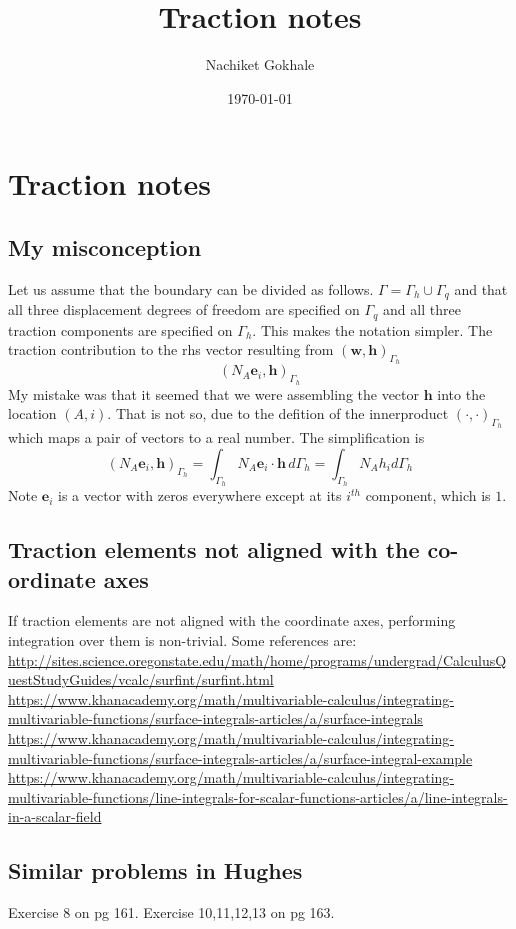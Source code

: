 \documentclass{article}
\newcommand{\beq}{\begin{equation}}
\newcommand{\eeq}{\end{equation}}
\begin{document}
\title{Traction notes}
\author{Nachiket Gokhale}
\date{\today}
\maketitle
\section{Traction notes}
\subsection{My misconception}
Let us assume that the boundary can be divided as follows. $\Gamma=\Gamma_h\cup\Gamma_q$ and that all three displacement degrees of freedom are specified on $\Gamma_q$ and all three traction components are specified on $\Gamma_h$. This makes the notation simpler. The traction contribution to the rhs vector resulting from $(\mathbf{w},\mathbf{h})_{\Gamma_h}$
\beq
(N_A\mathbf{e}_{i},\mathbf{h})_{\Gamma_h}
\eeq
My mistake was that it seemed that we were assembling the vector $\mathbf{h}$ into the location $(A,i)$. That is not so, due to the defition of the innerproduct $(\cdot,\cdot)_{\Gamma_h}$ which maps a pair of vectors to a real number. The simplification is
\beq
(N_A\mathbf{e}_{i},\mathbf{h})_{\Gamma_h} = \int_{\Gamma_h} N_{A}\mathbf{e}_{i}\cdot\mathbf{h}\,d\Gamma_{h} = \int_{\Gamma_h}N_Ah_id\Gamma_{h}
\eeq
Note $\mathbf{e}_{i}$ is a vector with zeros everywhere except at its $i^{th}$ component, which is $1$.
\subsection{Traction elements not aligned with the co-ordinate axes}
If traction elements are not aligned with the coordinate axes, performing integration over them is non-trivial. Some references are:\\
\url{http://sites.science.oregonstate.edu/math/home/programs/undergrad/CalculusQuestStudyGuides/vcalc/surfint/surfint.html}\\
\url{https://www.khanacademy.org/math/multivariable-calculus/integrating-multivariable-functions/surface-integrals-articles/a/surface-integrals}\\
\url{https://www.khanacademy.org/math/multivariable-calculus/integrating-multivariable-functions/surface-integrals-articles/a/surface-integral-example}\\
\url{https://www.khanacademy.org/math/multivariable-calculus/integrating-multivariable-functions/line-integrals-for-scalar-functions-articles/a/line-integrals-in-a-scalar-field}
\subsection{Similar problems in Hughes}
Exercise 8 on pg 161. Exercise 10,11,12,13 on pg 163.
\end{document}
